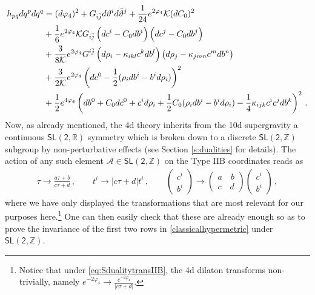 %
\begin{align}\label{classicalhypermetric}
	\nonumber h_{pq} d q^p d q^q &= (d \varphi_4)^2 + G_{i \bar j} d \vartheta^i d \bar \vartheta^j + \frac{1}{24} e^{2\varphi_4}{\cal K} (d C_0)^2\\
	\nonumber  &+\frac{1}{6}e^{2\varphi_4}{\cal K} G_{i \bar j} \left(d c^i-C_0 d b^i\right) \left(d c^j-C_0 d b^j\right)\\
	&+\frac{3}{8{\cal K}}e^{2\varphi_4}G^{i \bar j}\left(d \rho_i - \kappa_{ikl} c^k d b^l\right)\left(d \rho_j - \kappa_{jmn} c^m d b^n\right)\\
	\nonumber &+\frac{3}{2{\cal K}}e^{2\varphi_4}\left(d c^0-\frac{1}{2}(\rho_id b^i -b^i d \rho_i)\right)^2\\
	\nonumber&+\frac{1}{2}e^{4\varphi_4}\left(d b^0+C_0d c^0 +c^i d \rho_i+\frac{1}{2}C_0(\rho_id b^i- b^i d \rho_i)-\frac{1}{4} \kappa_{ijk}c^i c^jd  b^k\right)^2\, .
\end{align}
%
Now, as already mentioned, the 4d theory inherits from the 10d supergravity a continuous $\mathsf{SL(2,\mathbb{R})}$ symmetry which is broken down to a discrete $\mathsf{SL(2,\mathbb{Z})}$ subgroup by non-perturbative effects (see Section \ref{s:dualities} for details). The action of any such element $\mathcal{A} \in \mathsf{SL(2,\mathbb{Z})}$ on the Type IIB coordinates reads as \cite{Gunther:1998sc, Bohm:1999uk}
%
\begin{align}\label{eq:SdualitytransIIB}
	\tau \rightarrow \frac{a\tau + b}{c\tau+d}\,,\qquad
	t^i \rightarrow |c\tau+d| t^i \,,\qquad
	\begin{pmatrix}
		c^i\\b^i
	\end{pmatrix}
	\rightarrow
	\begin{pmatrix}
		a \quad  b\\c \quad  d
	\end{pmatrix}
	\begin{pmatrix}
		c^i\\b^i
	\end{pmatrix}\, , 
\end{align}
%
where we have only displayed the transformations that are most relevant for our purposes here.\footnote{\label{fnote:SL2Zcontactpotential}Notice that under \eqref{eq:SdualitytransIIB}, the 4d dilaton transforms non-trivially, namely $e^{-2\varphi_4} \rightarrow \frac{e^{-2\varphi_4}}{|c\tau+d|}$.} One can then easily check that these are already enough so as to prove the invariance of the first two rows in \eqref{classicalhypermetric} under $\mathsf{SL(2,\mathbb{Z})}$.
	
